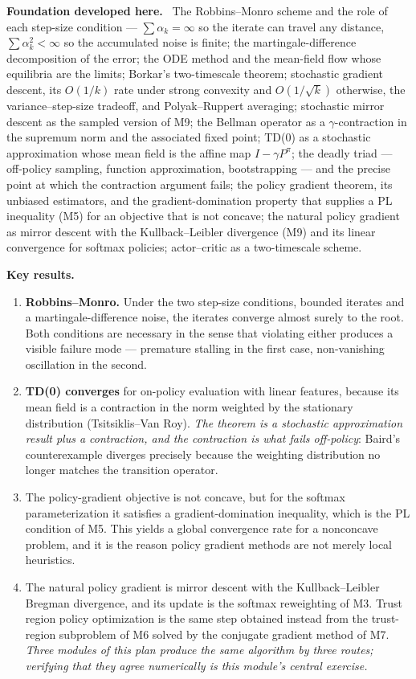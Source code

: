 \documentclass[11pt,a4paper]{article}
\newcommand{\mpart}[1]{\smallskip\noindent\textbf{#1}\ \ignorespaces}
\begin{document}
\mpart{Foundation developed here.} The Robbins--Monro scheme and the role of each step-size
condition --- $\sum\alpha_k=\infty$ so the iterate can travel any distance,
$\sum\alpha_k^2<\infty$ so the accumulated noise is finite; the martingale-difference
decomposition of the error; the ODE method and the mean-field flow whose equilibria are the
limits; Borkar's two-timescale theorem; stochastic gradient descent, its $O(1/k)$ rate under
strong convexity and $O(1/\sqrt k)$ otherwise, the variance--step-size tradeoff, and
Polyak--Ruppert averaging; stochastic mirror descent as the sampled version of M9; the Bellman
operator as a $\gamma$-contraction in the supremum norm and the associated fixed point;
TD(0) as a stochastic approximation whose mean field is the affine map $I-\gamma P^\pi$;
the deadly triad --- off-policy sampling, function approximation, bootstrapping --- and the
precise point at which the contraction argument fails; the policy gradient theorem, its
unbiased estimators, and the gradient-domination property that supplies a PL inequality (M5)
for an objective that is not concave; the natural policy gradient as mirror descent with the
Kullback--Leibler divergence (M9) and its linear convergence for softmax policies;
actor--critic as a two-timescale scheme.

\mpart{Key results.}
\begin{enumerate}
\item \textbf{Robbins--Monro.} Under the two step-size conditions, bounded iterates and a
martingale-difference noise, the iterates converge almost surely to the root. Both conditions
are necessary in the sense that violating either produces a visible failure mode --- premature
stalling in the first case, non-vanishing oscillation in the second.
\item \textbf{TD(0) converges} for on-policy evaluation with linear features, because its mean
field is a contraction in the norm weighted by the stationary distribution
(Tsitsiklis--Van Roy). \emph{The theorem is a stochastic approximation result plus a
contraction, and the contraction is what fails off-policy}: Baird's counterexample diverges
precisely because the weighting distribution no longer matches the transition operator.
\item The policy-gradient objective is not concave, but for the softmax parameterization it
satisfies a gradient-domination inequality, which is the PL condition of M5. This yields a
global convergence rate for a nonconcave problem, and it is the reason policy gradient methods
are not merely local heuristics.
\item The natural policy gradient is mirror descent with the Kullback--Leibler Bregman
divergence, and its update is the softmax reweighting of M3. Trust region policy optimization
is the same step obtained instead from the trust-region subproblem of M6 solved by the
conjugate gradient method of M7. \emph{Three modules of this plan produce the same algorithm by
three routes; verifying that they agree numerically is this module's central exercise.}
\end{enumerate}
\end{document}
